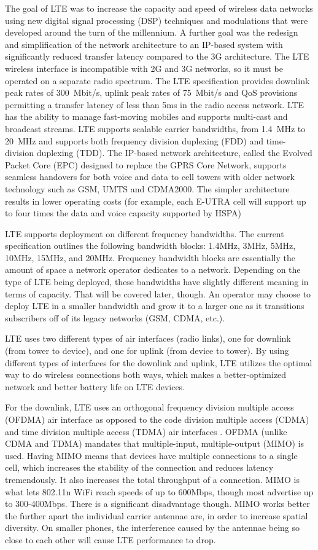 The goal of LTE was to increase the capacity and speed of wireless data networks using new digital signal processing (DSP) techniques and modulations that were developed around the turn of the millennium. A further goal was the redesign and simplification of the network architecture to an IP-based system with significantly reduced transfer latency compared to the 3G architecture. The LTE wireless interface is incompatible with 2G and 3G networks, so it must be operated on a separate radio spectrum. The LTE specification provides downlink peak rates of 300~Mbit/s, uplink peak rates of 75~Mbit/s and QoS provisions permitting a transfer latency of less than 5ms in the radio access network. LTE has the ability to manage fast-moving mobiles and supports multi-cast and broadcast streams. LTE supports scalable carrier bandwidths, from 1.4~MHz to 20~MHz and supports both frequency division duplexing (FDD) and time-division duplexing (TDD). The IP-based network architecture, called the Evolved Packet Core (EPC) designed to replace the GPRS Core Network, supports seamless handovers for both voice and data to cell towers with older network technology such as GSM, UMTS and CDMA2000. The simpler architecture results in lower operating costs (for example, each E-UTRA cell will support up to four times the data and voice capacity supported by HSPA)

LTE supports deployment on different frequency bandwidths. The current specification outlines the following bandwidth blocks: 1.4MHz, 3MHz, 5MHz, 10MHz, 15MHz, and 20MHz. Frequency bandwidth blocks are essentially the amount of space a network operator dedicates to a network. Depending on the type of LTE being deployed, these bandwidths have slightly different meaning in terms of capacity. That will be covered later, though. An operator may choose to deploy LTE in a smaller bandwidth and grow it to a larger one as it transitions subscribers off of its legacy networks (GSM, CDMA, etc.).

LTE uses two different types of air interfaces (radio links), one for downlink (from tower to device), and one for uplink (from device to tower). By using different types of interfaces for the downlink and uplink, LTE utilizes the optimal way to do wireless connections both ways, which makes a better-optimized network and better battery life on LTE devices.

For the downlink, LTE uses an orthogonal frequency division multiple access (OFDMA) air interface as opposed to the code division multiple access (CDMA) and time division multiple access (TDMA) air interfaces . OFDMA (unlike CDMA and TDMA) mandates that multiple-input, multiple-output (MIMO) is used. Having MIMO means that devices have multiple connections to a single cell, which increases the stability of the connection and reduces latency tremendously. It also increases the total throughput of a connection. MIMO is what lets 802.11n WiFi reach speeds of up to 600Mbps, though most advertise up to 300-400Mbps. There is a significant disadvantage though. MIMO works better the further apart the individual carrier antennae are, in order to increase spatial diversity. On smaller phones, the interference caused by the antennae being so close to each other will cause LTE performance to drop. 

